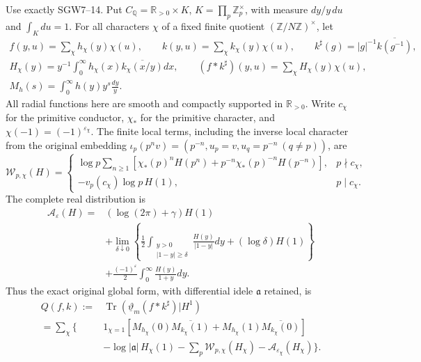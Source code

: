 Use exactly SGW7--14. Put
$C_{\mathbb Q}=\mathbb R_{>0}\times K$,
$K=\prod_p\mathbb Z_p^\times$, with measure $dy/y\,du$ and
$\int_Kdu=1$.
For all characters $\chi$ of a fixed finite quotient
$(\mathbb Z/N\mathbb Z)^\times$, let
\begin{equation}\tag{FTR18}\label{eq:FTR-globaltest}
 \begin{gathered}
 f(y,u)=\sum_\chi h_\chi(y)\chi(u),\qquad
 k(y,u)=\sum_\chi k_\chi(y)\chi(u),\qquad
 k^\sharp(g)=|g|^{-1}\overline{k(g^{-1})},\\
 H_\chi(y)=y^{-1}\int_0^\infty
              h_\chi(x)\overline{k_\chi(x/y)}dx,\qquad
 (f*k^\sharp)(y,u)=\sum_\chi H_\chi(y)\chi(u),\\
 M_h(s)=\int_0^\infty h(y)y^s\frac{dy}{y}.
 \end{gathered}
\end{equation}
All radial functions here are smooth and compactly supported in
$\mathbb R_{>0}$. Write $c_\chi$ for the primitive conductor,
$\chi_*$ for the primitive character, and
$\chi(-1)=(-1)^{\varepsilon_\chi}$.
The finite local terms, including the inverse local character
from the original embedding
$\iota_p(p^nv)=(p^{-n},u_p=v,u_q=p^{-n}\ (q\ne p))$, are
\begin{equation}\tag{FTR19}\label{eq:FTR-globalfinite}
 \mathcal W_{p,\chi}(H)=
 \begin{cases}
 \displaystyle\log p\sum_{n\geq1}
   [\chi_*(p)^nH(p^n)+p^{-n}\chi_*(p)^{-n}H(p^{-n})],
                                      &p\nmid c_\chi,\\
 -v_p(c_\chi)\log p\,H(1),&p\mid c_\chi.
 \end{cases}
\end{equation}
The complete real distribution is
\begin{equation}\tag{FTR20}\label{eq:FTR-archimedean}
 \begin{aligned}
 \mathcal A_\varepsilon(H)={}&(\log(2\pi)+\gamma)H(1)\\
 &+\lim_{\delta\downarrow0}\left\{
 \frac12\int_{\substack{y>0\\|1-y|\geq\delta}}
       \frac{H(y)}{|1-y|}dy+(\log\delta)H(1)\right\}\\
 &+\frac{(-1)^\varepsilon}{2}
           \int_0^\infty\frac{H(y)}{1+y}dy.
 \end{aligned}
\end{equation}
Thus the exact original global form, with differential idele
$\mathfrak a$ retained, is
\begin{equation}\tag{FTR21}\label{eq:FTR-globalfull}
 \begin{aligned}
 Q(f,k):={}&\operatorname{Tr}
       (\underline\vartheta_m(f*k^\sharp)|H^1)\\
 =\sum_\chi\bigg\{&1_{\chi=1}
       [M_{h_\chi}(0)\overline{M_{k_\chi}(1)}
        +M_{h_\chi}(1)\overline{M_{k_\chi}(0)}]\\
 &-\log|\mathfrak a|\,H_\chi(1)
       -\sum_p\mathcal W_{p,\chi}(H_\chi)
       -\mathcal A_{\varepsilon_\chi}(H_\chi)\bigg\}.
 \end{aligned}
\end{equation}
